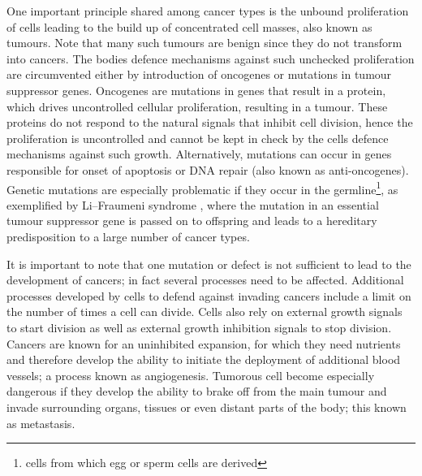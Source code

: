One important principle shared among cancer types is the unbound proliferation of cells leading to the build up of concentrated cell masses, also known as tumours. Note that many such tumours are benign since they do not transform into cancers. The bodies defence mechanisms against such unchecked proliferation are circumvented either by introduction of oncogenes or mutations in tumour suppressor genes. Oncogenes are mutations in genes that result in a protein, which drives uncontrolled cellular proliferation, resulting in a tumour. These proteins do not respond to the natural signals that inhibit cell division, hence the proliferation is uncontrolled and cannot be kept in check by the cells defence mechanisms against such growth. Alternatively, mutations can occur in genes responsible for onset of apoptosis or DNA repair (also known as anti-oncogenes). Genetic mutations are especially problematic if they occur in the germline\footnote{cells from which egg or sperm cells are derived}, as exemplified by Li–Fraumeni syndrome \citep{Li:1969kl}, where the mutation in an essential tumour suppressor gene is passed on to offspring and leads to a hereditary predisposition to a large number of cancer types.

It is important to note that one mutation or defect is not sufficient to lead to the development of cancers; in fact several processes need to be affected. Additional processes developed by cells to defend against invading cancers include a limit on the number of times a cell can divide. Cells also rely on external growth signals to start division as well as external growth inhibition signals to stop division. Cancers are known for an uninhibited expansion, for which they need nutrients and therefore develop the ability to initiate the deployment of additional blood vessels; a process known as angiogenesis. Tumorous cell become especially dangerous if they develop the ability to brake off from the main tumour and invade surrounding organs, tissues or even distant parts of the body; this known as metastasis.

